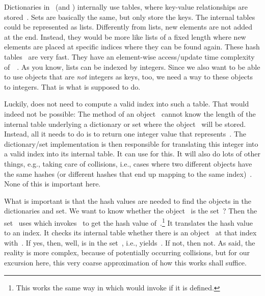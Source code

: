 Dictionaries in \python\ (and ) internally use tables, where key-value relationships are stored~\cite{G2020PHTUTH,L2011PDI}.
Sets are basically the same, but only store the keys.
The internal tables could be represented as lists.
Differently from lists, new elements are not added at the end.
Instead, they would be more like lists of a fixed length where new elements are placed at specific indices where they can be found again.
These hash tables~\cite{K1998SAS,CLRS2009ITA,SKS2019DSC} are very fast.
They have an element-wise access/update time complexity of~~\cite{H2024PBOTTCODDSIPP33,B2023T,N2022CCSFPO}.
As you know, lists can be indexed by integers.
Since we also want to be able to use objects that are \emph{not} integers as keys, too, we need a way to  these objects to integers.
That is what  is supposed to do.

Luckily,  does not need to compute a valid index into such a table.
That would indeed not be possible:
The  method of an object~ cannot know the length of the internal table underlying a dictionary or set where the object~ will be stored.
Instead, all it needs to do is to return one integer value that represents~.
The dictionary/set implementation is then responsible for translating this integer into a valid index into its internal table.
It can use  for this.
It will also do lots of other things, e.g., taking care of collisions, i.e., cases where two different objects have the same hashes (or different hashes that end up mapping to the same index)~\cite{G2020PHTUTH,L2011PDI}.
None of this is important here.

What is important is that the hash values are needed to find the objects in the dictionaries and set.
We want to know whether the object~ is  the set~?
Then the set~ uses  which invokes~ to get the hash value of~.\footnote{%
This works the same way in which  would invoke  if it is defined.}
It translates the hash value to an index.
It checks its internal table whether there is an object~ at that index with~.
If yes, then, well,  is in the set~, i.e.,  yields~.
If not, then not.
As said, the reality is more complex, because of potentially occurring collisions, but for our excursion here, this very coarse approximation of how this works shall suffice.

